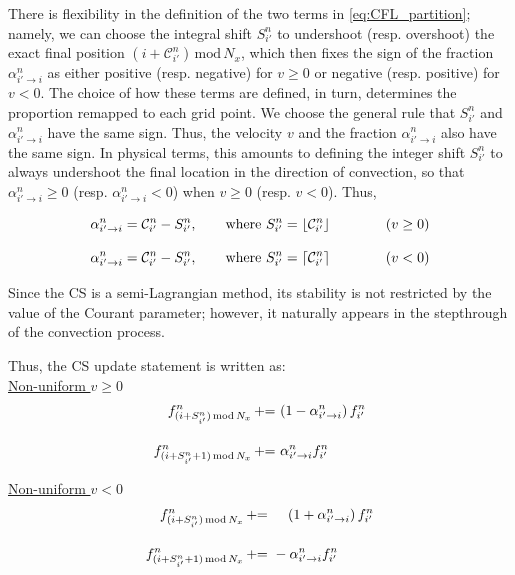 \documentclass[11pt,titlepage]{report}
\DeclarePairedDelimiter\ceil{\lceil}{\rceil}
\DeclarePairedDelimiter\floor{\lfloor}{\rfloor}
\begin{document}
There is flexibility in the definition of the two terms in \eqref{eq:CFL_partition}; namely, we can choose the integral shift $S_{i'}^n$ to undershoot (resp. overshoot) the exact final position $(i + \mathcal{C}_{i'}^n)\,\mathrm{mod}\, N_x$, which then fixes the sign of the fraction $\alpha_{i'\to i}^n$ as either positive (resp. negative) for $v \geq 0$ or negative (resp. positive) for $v < 0$. The choice of how these terms are defined, in turn, determines the proportion remapped to each grid point. We choose the general rule that $S_{i'}^n$ and $\alpha_{i'\to i}^n$ have the same sign. Thus, the velocity $v$ and the fraction $\alpha_{i'\to i}^n$ also have the same sign. In physical terms, this amounts to defining the integer shift $S_{i'}^n$ to always undershoot the final location in the direction of convection, so that $\alpha_{i'\to i}^n \geq 0$ (resp. $\alpha_{i'\to i}^n < 0$) when $v \geq 0$ (resp. $v < 0$). Thus,

$$\alpha_{i'\to i}^n = \mathcal{C}_{i'}^n - S_{i'}^n,\qquad \textrm{where } S_{i'}^n = \floor{\mathcal{C}_{i'}^n} \qquad \qquad (v \geq 0)$$

$$\alpha_{i'\to i}^n = \mathcal{C}_{i'}^n - S_{i'}^n,\qquad \textrm{where } S_{i'}^n = \ceil{\mathcal{C}_{i'}^n} \qquad \qquad (v < 0)$$

\noindent Since the CS is a semi-Lagrangian method, its stability is not restricted by the value of the Courant parameter; however, it naturally appears in the stepthrough of the convection process.

Thus, the CS update statement is written as:\\[0.3em]

\underline{Non-uniform $v \geq 0$}
\begin{subequations}
\label{eq:CS_update_increment_version_alpha_i_n_v_positive}
\begin{align}
f_{(i+S_{i'}^n)\,\mathrm{mod}\,N_x}^{n} \,+\hspace{-.3em}=&\,\, (1 - \alpha_{i'\to i}^n )\, f^{n}_{i'} \\[1em]
f_{(i+S_{i'}^n+1)\,\mathrm{mod}\,N_x}^{n}\, +\hspace{-.3em}=& \,\,\alpha_{i'\to i}^n f_{i'}^{n}
\end{align}
\end{subequations}


\underline{Non-uniform $v < 0$}
\begin{subequations}
\label{eq:CS_update_increment_version_alpha_i_n_v_negative}
\begin{align}
f_{(i+S_{i'}^n)\,\mathrm{mod}\,N_x}^{n} \,+\hspace{-.3em}=&\,\,\,\phantom{-}\,(1 + \alpha_{i'\to i}^n )\, f^{n}_{i'} \\[1em]
f_{(i+S_{i'}^n+1)\,\mathrm{mod}\,N_x}^{n}\, +\hspace{-.3em}=& \,\,-\alpha_{i'\to i}^n f_{i'}^{n}
\end{align}
\end{subequations}
\end{document}
